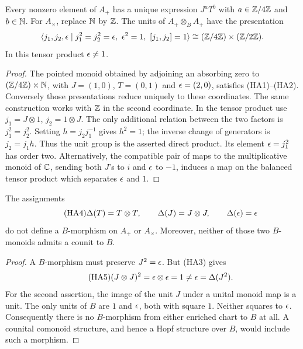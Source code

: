 \begin{lemma}
Every nonzero element of $A_+$ has a unique expression $J^aT^b$ with
$a\in\mathbb Z/4\mathbb Z$ and $b\in\mathbb N$. For $A_\times$, replace $\mathbb N$ by $\mathbb Z$.
The units of $A_+\otimes_B A_+$ have the presentation
\[
 \langle j_1,j_2,\epsilon\mid
 j_1^2=j_2^2=\epsilon,\ \epsilon^2=1,\ [j_1,j_2]=1\rangle
 \cong (\mathbb Z/4\mathbb Z)\times(\mathbb Z/2\mathbb Z).
\]
In this tensor product $\epsilon\ne1$.
\end{lemma}
\begin{proof}
The pointed monoid obtained by adjoining an absorbing zero to
$(\mathbb Z/4\mathbb Z)\times\mathbb N$, with $J=(1,0)$, $T=(0,1)$ and
$\epsilon=(2,0)$, satisfies (HA1)--(HA2). Conversely those presentations
reduce uniquely to these coordinates. The same construction works with
$\mathbb Z$ in the second coordinate. In the tensor product use
$j_1=J\otimes1$, $j_2=1\otimes J$. The only additional relation between
the two factors is $j_1^2=j_2^2$. Setting $h=j_2j_1^{-1}$ gives
$h^2=1$; the inverse change of generators is $j_2=j_1h$.
Thus the unit group is the asserted direct product. Its element
$\epsilon=j_1^2$ has order two. Alternatively, the compatible pair of maps
to the multiplicative monoid of $\mathbb C$, sending both $J$'s to $i$ and
$\epsilon$ to $-1$, induces a map on the balanced tensor product which
separates $\epsilon$ and $1$.
\end{proof}

\begin{proposition}
The assignments
\begin{equation}\tag{HA4}
 \Delta(T)=T\otimes T,\qquad
 \Delta(J)=J\otimes J,\qquad \Delta(\epsilon)=\epsilon
\end{equation}
do not define a $B$-morphism on $A_+$ or $A_\times$.
Moreover, neither of those two $B$-monoids admits a counit to $B$.
\end{proposition}
\begin{proof}
A $B$-morphism must preserve $J^2=\epsilon$. But (HA3) gives
\begin{equation}\tag{HA5}
 (J\otimes J)^2=\epsilon\otimes\epsilon=1\ne\epsilon
       =\Delta(J^2).
\end{equation}
For the second assertion, the image of the unit $J$ under a unital monoid
map is a unit. The only units of $B$ are $1$ and $\epsilon$, both with square
$1$. Neither squares to $\epsilon$. Consequently there is no $B$-morphism
from either enriched chart to $B$ at all. A counital comonoid structure,
and hence a Hopf structure over $B$, would include such a morphism.
\end{proof}

